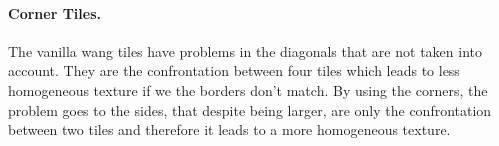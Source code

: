 \paragraph{Corner Tiles. \cite{LD06AWTCECC}} %
 \label{par:corner_tiles}

The vanilla wang tiles have problems in the diagonals that are not taken into account. They are the confrontation between four tiles which leads to less homogeneous texture if we the borders don't match. By using the corners, the problem goes to the sides, that despite being larger, are only the confrontation between two tiles and therefore it leads to a more homogeneous texture.






